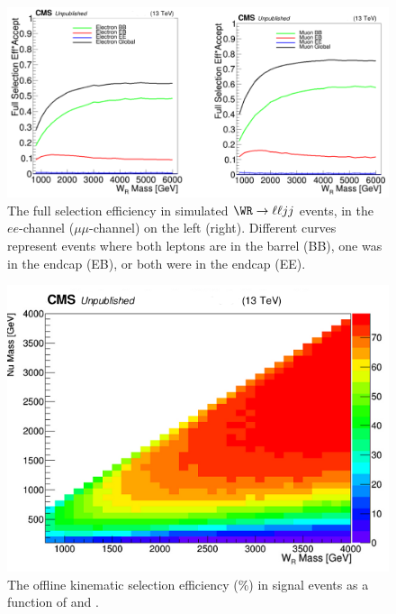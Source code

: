 \begin{figure}[h]
	\centering
	\includegraphics[width=1.0\textwidth]{figures/wrRecoSelectionEfficiency.png}
	\caption{The full selection efficiency in simulated $\WR \rightarrow \ell\ell jj$ events, in the $ee$-channel ($\mu\mu$-channel) 
		on the left (right).  Different curves represent events where both leptons are in the barrel (BB), one was in the 
	endcap (EB), or both were in the endcap (EE).}
	\label{fig:wrRecoSelectionEff}
\end{figure}

\begin{figure}[h]
	\centering
	\includegraphics[width=1.0\textwidth]{figures/genWrMuMuAccEff_NoMassWindows13TeV.png}
	\caption{The offline kinematic selection efficiency (\%) in signal events as a function of \mWR and \mnul.}
	\label{fig:wrOffSelEffVarMWrMNu}
\end{figure}

\clearpage

